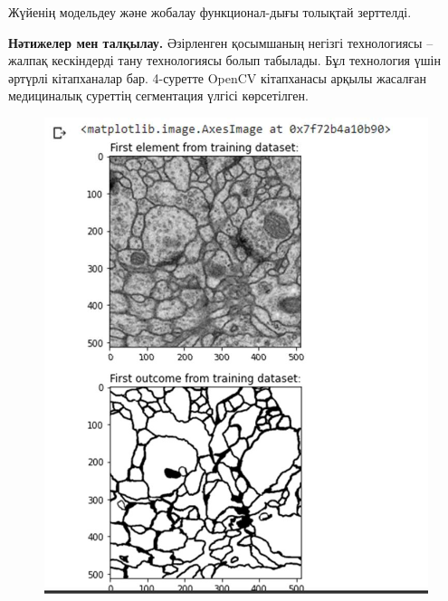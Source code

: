 \begin{multicols}{2}


Жүйенің модельдеу және жобалау функционал-дығы толықтай зерттелді.

{\bfseries Нәтижелер мен талқылау.} Әзірленген қосымшаның негізгі
технологиясы -- жалпақ кескіндерді тану технологиясы болып табылады. Бұл
технология үшін әртүрлі кітапханалар бар. 4-суретте OpenCV кітапханасы
арқылы жасалған медициналық суреттің сегментация үлгісі көрсетілген.
\end{multicols}

\begin{figure}[H]
  \centering
  \begin{minipage}{0.45\textwidth}
      \centering
      \includegraphics[width=1\textwidth]{assets/194}
      \caption*{}
  \end{minipage}
  \hfill
  \begin{minipage}{0.45\textwidth}
      \centering

\end{minipage}
\end{figure}

